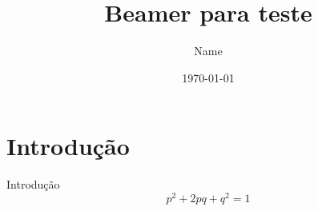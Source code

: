 \documentclass{beamer}
\begin{document}
	\title{Beamer para teste}
	\author{Name}
	\date{\today}
	
\begin{frame}
	\titlepage
\end{frame}
	
\section{Introdução}
\begin{frame}{Introdução}
	\begin{equation}
		p^2 + 2pq + q^2 = 1
	\end{equation}
\end{frame}
	
\end{document}
